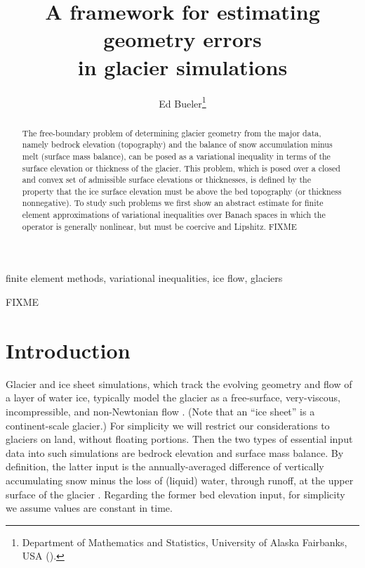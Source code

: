 \documentclass[hidelinks,onefignum,onetabnum,final]{siamart220329}  %
\title{A framework for estimating geometry errors \\ in glacier simulations}
\author{Ed Bueler\thanks{Department of Mathematics and Statistics, University of Alaska Fairbanks, USA (\email{elbueler@alaska.edu}).}}
\begin{document}
\maketitle

\begin{abstract}
The free-boundary problem of determining glacier geometry from the major data, namely bedrock elevation (topography) and the balance of snow accumulation minus melt (surface mass balance), can be posed as a variational inequality in terms of the surface elevation or thickness of the glacier.  This problem, which is posed over a closed and convex set of admissible surface elevations or thicknesses, is defined by the property that the ice surface elevation must be above the bed topography (or thickness nonnegative).  To study such problems we first show an abstract estimate for finite element approximations of variational inequalities over Banach spaces in which the operator is generally nonlinear, but must be coercive and Lipshitz.  FIXME
\end{abstract}

\begin{keywords}
finite element methods, variational inequalities, ice flow, glaciers
\end{keywords}

\begin{MSCcodes}
FIXME
\end{MSCcodes}


\section{Introduction} \label{sec:intro}

Glacier and ice sheet simulations, which track the evolving geometry and flow of a layer of water ice, typically model the glacier as a free-surface, very-viscous, incompressible, and non-Newtonian flow \cite{SchoofHewitt2013}.  (Note that an ``ice sheet'' is a continent-scale glacier.)  For simplicity we will restrict our considerations to glaciers on land, without floating portions.  Then the two types of essential input data into such simulations are bedrock elevation and surface mass balance.  By definition, the latter input is the annually-averaged difference of vertically accumulating snow minus the loss of (liquid) water, through runoff, at the upper surface of the glacier \cite{Cogleyetal2011}.  Regarding the former bed elevation input, for simplicity we assume values are constant in time.
\end{document}
